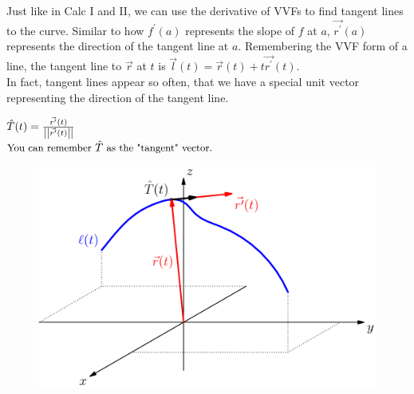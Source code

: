 \noindent
Just like in Calc I and II, we can use the derivative of VVFs to find tangent lines to the curve. Similar to how $f^{\prime}(a)$ represents the slope of $f$ at $a$, $\vec{r^\prime}(a)$ represents the direction of the tangent line at $a$. Remembering the VVF form of a line, the tangent line to $\vec{r}$ at $t$ is $\vec{l}(t)=\vec{r}(t)+t\vec{r^\prime}(t)$.\\
In fact, tangent lines appear so often, that we have a special unit vector representing the direction of the tangent line.
\begin{center}
	$\hat{T}(t)=\frac{\vec{r^\prime}(t)}{\left|\left|\vec{r^\prime}(t)\right|\right|}$\\
	$\small{\text{You can remember }\hat{T}\text{ as the "tangent" vector.}}$
\end{center}

\begin{figure}[h]
	\centering
	\includegraphics[scale=0.33]{Images/vectorValuedFunctions/TangentVector}
\end{figure}